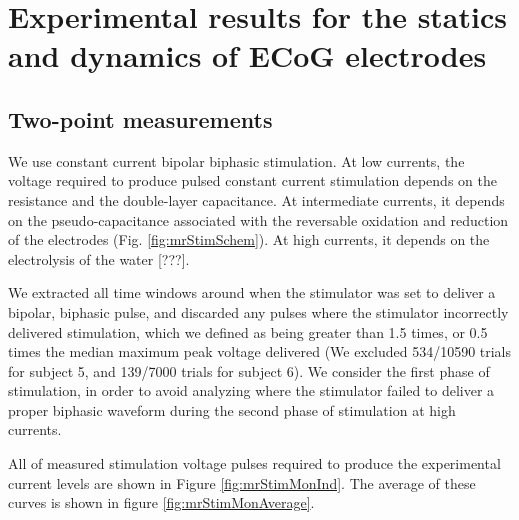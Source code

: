 \section{Experimental results for the statics and dynamics of ECoG electrodes}

%

\subsection{Two-point measurements}

We use constant current bipolar biphasic stimulation. At low currents, the voltage required to produce pulsed constant current stimulation depends on the resistance and the double-layer capacitance. At intermediate currents, it depends on the pseudo-capacitance associated with the reversable oxidation and reduction of the electrodes (Fig. \ref{fig:mrStimSchem}). At high currents, it depends on the electrolysis of the water [???].

We extracted all time windows around when the stimulator was set to deliver a bipolar, biphasic pulse, and discarded any pulses where the stimulator incorrectly delivered stimulation, which we defined as being greater than 1.5 times, or 0.5 times the median maximum peak voltage delivered (We excluded 534/10590 trials for subject 5, and 139/7000 trials for subject 6). We consider the first phase of stimulation, in order to avoid analyzing where the stimulator failed to deliver a proper biphasic waveform during the second phase of stimulation at high currents. 

All of measured stimulation voltage pulses required to produce the experimental current levels are shown in Figure \ref{fig:mrStimMonInd}. The average of these curves is shown in figure \ref{fig:mrStimMonAverage}.
	
